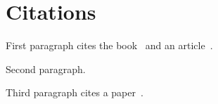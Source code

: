 \documentclass{article}
\begin{document}
\section{Citations}
First paragraph cites the book~\cite{knuth-book} and an article~\cite{lamport-art}.

Second paragraph.

Third paragraph cites a paper~\cite{child-in}.



\end{document}
